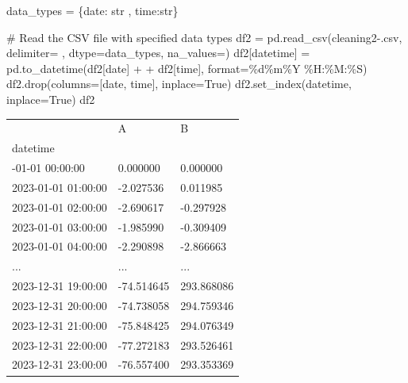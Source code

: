 \documentclass[
  letterpaper,
  DIV=11,
  numbers=noendperiod,
  oneside]{scrreprt}
\newenvironment{Shaded}{\begin{snugshade}}{\end{snugshade}}
\newcommand{\BuiltInTok}[1]{\textcolor[rgb]{0.00,0.23,0.31}{#1}}
\newcommand{\CommentTok}[1]{\textcolor[rgb]{0.37,0.37,0.37}{#1}}
\newcommand{\NormalTok}[1]{\textcolor[rgb]{0.00,0.23,0.31}{#1}}
\newcommand{\OperatorTok}[1]{\textcolor[rgb]{0.37,0.37,0.37}{#1}}
\newcommand{\SpecialCharTok}[1]{\textcolor[rgb]{0.37,0.37,0.37}{#1}}
\newcommand{\StringTok}[1]{\textcolor[rgb]{0.13,0.47,0.30}{#1}}
\newcommand{\VariableTok}[1]{\textcolor[rgb]{0.07,0.07,0.07}{#1}}
\begin{document}
\begin{Shaded}
\begin{Highlighting}[]
\NormalTok{data\_types }\OperatorTok{=}\NormalTok{ \{}\StringTok{\textquotesingle{}date\textquotesingle{}}\NormalTok{: }\BuiltInTok{str}\NormalTok{ , }\StringTok{\textquotesingle{}time\textquotesingle{}}\NormalTok{:}\BuiltInTok{str}\NormalTok{\}}

\CommentTok{\# Read the CSV file with specified data types}
\NormalTok{df2 }\OperatorTok{=}\NormalTok{ pd.read\_csv(}\StringTok{\textquotesingle{}cleaning2{-}.csv\textquotesingle{}}\NormalTok{, delimiter}\OperatorTok{=}\StringTok{\textquotesingle{} \textquotesingle{}}\NormalTok{, dtype}\OperatorTok{=}\NormalTok{data\_types, na\_values}\OperatorTok{=}\StringTok{\textquotesingle{}{-}\textquotesingle{}}\NormalTok{)}
\NormalTok{df2[}\StringTok{\textquotesingle{}datetime\textquotesingle{}}\NormalTok{] }\OperatorTok{=}\NormalTok{ pd.to\_datetime(df2[}\StringTok{\textquotesingle{}date\textquotesingle{}}\NormalTok{] }\OperatorTok{+} \StringTok{\textquotesingle{} \textquotesingle{}} \OperatorTok{+}\NormalTok{ df2[}\StringTok{\textquotesingle{}time\textquotesingle{}}\NormalTok{], }\BuiltInTok{format}\OperatorTok{=}\StringTok{\textquotesingle{}}\SpecialCharTok{\%d}\StringTok{\%m\%Y \%H:\%M:\%S\textquotesingle{}}\NormalTok{)}
\NormalTok{df2.drop(columns}\OperatorTok{=}\NormalTok{[}\StringTok{\textquotesingle{}date\textquotesingle{}}\NormalTok{, }\StringTok{\textquotesingle{}time\textquotesingle{}}\NormalTok{], inplace}\OperatorTok{=}\VariableTok{True}\NormalTok{)}
\NormalTok{df2.set\_index(}\StringTok{\textquotesingle{}datetime\textquotesingle{}}\NormalTok{, inplace}\OperatorTok{=}\VariableTok{True}\NormalTok{)}
\NormalTok{df2}
\end{Highlighting}
\end{Shaded}

\begin{longtable}[]{@{}lll@{}}
\toprule\noalign{}
& A & B \\
datetime & & \\
\midrule\noalign{}
\endhead
\bottomrule\noalign{}
\endlastfoot
2023-01-01 00:00:00 & 0.000000 & 0.000000 \\
2023-01-01 01:00:00 & -2.027536 & 0.011985 \\
2023-01-01 02:00:00 & -2.690617 & -0.297928 \\
2023-01-01 03:00:00 & -1.985990 & -0.309409 \\
2023-01-01 04:00:00 & -2.290898 & -2.866663 \\
... & ... & ... \\
2023-12-31 19:00:00 & -74.514645 & 293.868086 \\
2023-12-31 20:00:00 & -74.738058 & 294.759346 \\
2023-12-31 21:00:00 & -75.848425 & 294.076349 \\
2023-12-31 22:00:00 & -77.272183 & 293.526461 \\
2023-12-31 23:00:00 & -76.557400 & 293.353369 \\
\end{longtable}
\end{document}
